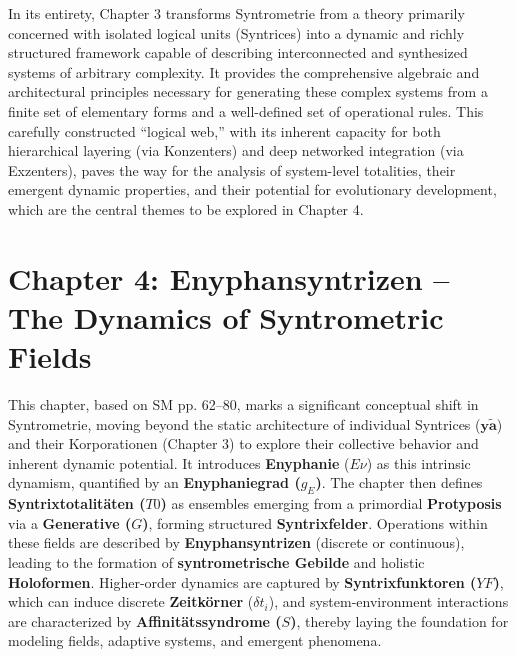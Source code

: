 \documentclass[12pt]{article}
\newcommand{\q}[1]{\enquote{#1}}
\newcommand{\syntrix}{\bm{y\widetilde{a}}}
\newcommand{\enyphaniegrad}{g_E}
\newcommand{\syntrixtotalitaet}{T0}
\newcommand{\generative}{G}
\newcommand{\syntrixfunktor}{YF}
\newcommand{\affinitaetssyndrom}{S}
\newcommand{\zeitkorn}{\delta t_i}
\begin{document}
In its entirety, Chapter 3 transforms Syntrometrie from a theory primarily concerned with isolated logical units (Syntrices) into a dynamic and richly structured framework capable of describing interconnected and synthesized systems of arbitrary complexity. It provides the comprehensive algebraic and architectural principles necessary for generating these complex systems from a finite set of elementary forms and a well-defined set of operational rules. This carefully constructed \q{logical web,} with its inherent capacity for both hierarchical layering (via Konzenters) and deep networked integration (via Exzenters), paves the way for the analysis of system-level totalities, their emergent dynamic properties, and their potential for evolutionary development, which are the central themes to be explored in Chapter 4.

\clearpage

\section{Chapter 4: Enyphansyntrizen – The Dynamics of Syntrometric Fields}
\label{sec:chapter4}

This chapter, based on SM pp. 62–80, marks a significant conceptual shift in Syntrometrie, moving beyond the static architecture of individual Syntrices (\(\syntrix\)) and their Korporationen (Chapter 3) to explore their collective behavior and inherent dynamic potential. It introduces \textbf{Enyphanie} (\(E\nu\)) as this intrinsic dynamism, quantified by an \textbf{Enyphaniegrad (\(\enyphaniegrad\))}. The chapter then defines \textbf{Syntrixtotalitäten (\(\syntrixtotalitaet\))} as ensembles emerging from a primordial \textbf{Protyposis} via a \textbf{Generative (\(\generative\))}, forming structured \textbf{Syntrixfelder}. Operations within these fields are described by \textbf{Enyphansyntrizen} (discrete or continuous), leading to the formation of \textbf{syntrometrische Gebilde} and holistic \textbf{Holoformen}. Higher-order dynamics are captured by \textbf{Syntrixfunktoren (\(\syntrixfunktor\))}, which can induce discrete \textbf{Zeitkörner} (\(\zeitkorn\)), and system-environment interactions are characterized by \textbf{Affinitätssyndrome (\(\affinitaetssyndrom\))}, thereby laying the foundation for modeling fields, adaptive systems, and emergent phenomena.
\end{document}
